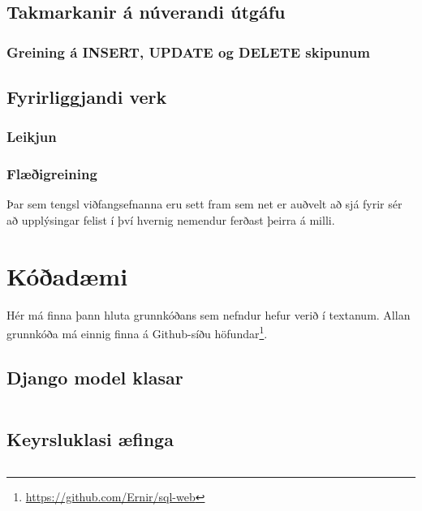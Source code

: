 \documentclass[a4paper,12pt,twoside,BCOR=10mm]{scrbook}
\begin{document}
\section{Takmarkanir á núverandi útgáfu}
\subsection{Greining á INSERT, UPDATE og DELETE skipunum}
\section{Fyrirliggjandi verk}
\subsection{Leikjun}
\subsection{Flæðigreining}
Þar sem tengsl viðfangsefnanna eru sett fram sem net er auðvelt að sjá fyrir sér að upplýsingar felist í því hvernig nemendur ferðast þeirra á milli.




\appendix
\renewcommand{\chaptername}{Appendix}
\chapter{Kóðadæmi}
Hér má finna þann hluta grunnkóðans sem nefndur hefur verið í textanum. Allan grunnkóða má einnig finna á Github-síðu höfundar\footnote{\url{https://github.com/Ernir/sql-web}}.
\section{Django model klasar}
\label{code:django-model-objects}
\inputminted[fontsize=\scriptsize, frame=lines, linenos=true, python3=true, label=models.py]{python}{../sql\string_web/models.py}
\section{Keyrsluklasi æfinga}
\label{code:example-runner}
\inputminted[fontsize=\scriptsize, frame=lines, linenos=true, python3=true, label=models.py]{python}{../sql\string_web/sql\string_runner.py}
\end{document}
